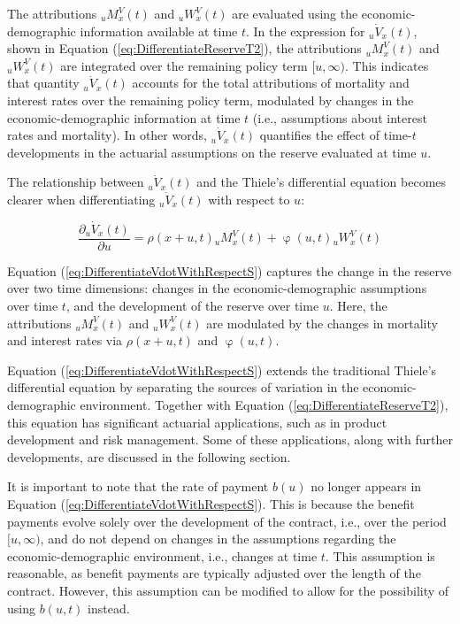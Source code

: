 \documentclass[12pt]{article}
\begin{document}
The attributions ${}_uM^V_x(t)$ and ${}_uW^V_x(t)$ are evaluated using the economic-demographic information available at time \( t \). In the expression for ${}_u\dot{V}_x(t)$, shown in Equation (\ref{eq:DifferentiateReserveT2}), the attributions ${}_uM^V_x(t)$ and ${}_uW^V_x(t)$ are integrated over the remaining policy term \( [u, \infty) \). This indicates that quantity ${}_u\dot{V}_x(t)$ accounts for the total attributions of mortality and interest rates over the remaining policy term, modulated by changes in the economic-demographic information at time \( t \) (i.e., assumptions about interest rates and mortality). In other words, ${}_u\dot{V}_x(t)$ quantifies the effect of time-\( t \) developments in the actuarial assumptions on the reserve evaluated at time \( u \).

 
The relationship between ${}_u\dot{V}_x(t)$ and the Thiele's differential equation becomes clearer when differentiating ${}_u\dot{V}_x(t)$ with respect to $u$: 

\begin{equation}\label{eq:DifferentiateVdotWithRespectS}
\dfrac{\partial	{}_u\dot{V}_x(t)}{\partial u}= \rho(x+u,t) {}_uM^V_x(t)+ \upvarphi(u,t) {}_uW^V_x(t)
\end{equation}

Equation (\ref{eq:DifferentiateVdotWithRespectS}) captures the change in the reserve over two time dimensions: changes in the economic-demographic assumptions over time \( t \), and the development of the reserve over time \( u \). Here, the attributions \( {}_uM^V_x(t) \) and \( {}_uW^V_x(t) \) are modulated by the changes in mortality and interest rates via \( \rho(x+u,t) \) and \( \upvarphi(u,t) \).

Equation (\ref{eq:DifferentiateVdotWithRespectS}) extends the traditional Thiele’s differential equation by separating the sources of variation in the economic-demographic environment. Together with Equation (\ref{eq:DifferentiateReserveT2}), this equation has significant actuarial applications, such as in product development and risk management. Some of these applications, along with further developments, are discussed in the following section.

It is important to note that the rate of payment \( b(u) \) no longer appears in Equation (\ref{eq:DifferentiateVdotWithRespectS}). This is because the benefit payments evolve solely over the development of the contract, i.e., over the period \( [u, \infty) \), and do not depend on changes in the assumptions regarding the economic-demographic environment, i.e., changes at time \( t \). This assumption is reasonable, as benefit payments are typically adjusted over the length of the contract. However, this assumption can be modified to allow for the possibility of using \( b(u,t) \) instead.
\end{document}
